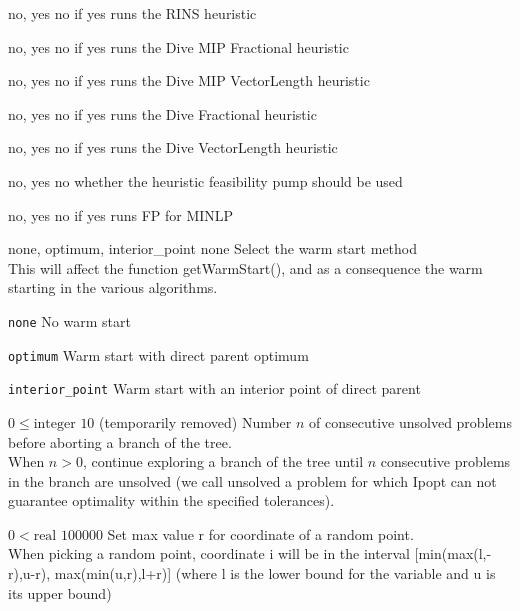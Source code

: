 %
{\ttfamily no, yes}%
{no}%
{if yes runs the RINS heuristic}%
{
}

%
{\ttfamily no, yes}%
{no}%
{if yes runs the Dive MIP Fractional heuristic}%
{
}

%
{\ttfamily no, yes}%
{no}%
{if yes runs the Dive MIP VectorLength heuristic}%
{
}

%
{\ttfamily no, yes}%
{no}%
{if yes runs the Dive Fractional heuristic}%
{
}

%
{\ttfamily no, yes}%
{no}%
{if yes runs the Dive VectorLength heuristic}%
{
}

%
{\ttfamily no, yes}%
{no}%
{whether the heuristic feasibility pump should be used}%
{
}

%
{\ttfamily no, yes}%
{no}%
{if yes runs FP for MINLP}%
{
}

%
{\ttfamily none, optimum, interior\_point}%
{none}%
{Select the warm start method\\
This will affect the function getWarmStart(), and as a consequence the warm starting in the various algorithms.}%
{\begin{list}{}{
\setlength{\parsep}{0em}
\setlength{\leftmargin}{5ex}
\setlength{\labelwidth}{2ex}
\setlength{\itemindent}{0ex}
\setlength{\topsep}{0pt}}
\item[\texttt{none}] No warm start
\item[\texttt{optimum}] Warm start with direct parent optimum
\item[\texttt{interior\_point}] Warm start with an interior point of direct parent
\end{list}
}

%
{$0\leq\textrm{integer}$}%
{$10$}%
{(temporarily removed) Number $n$ of consecutive unsolved problems before aborting a branch of the tree.\\
When $n > 0$, continue exploring a branch of the tree until $n$ consecutive problems in the branch are unsolved (we call unsolved a problem for which Ipopt can not guarantee optimality within the specified tolerances).}%
{}

%
{$0<\textrm{real}$}%
{$100000$}%
{Set max value r for coordinate of a random point.\\
When picking a random point, coordinate i will be in the interval [min(max(l,-r),u-r), max(min(u,r),l+r)] (where l is the lower bound for the variable and u is its upper bound)}%
{}

